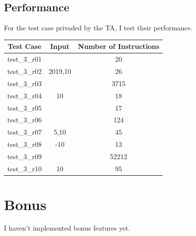 \documentclass{article}
\begin{document}
        \subsection{Performance}
            For the test case privaded by the TA, I test their performance.
            \begin{table}[!htbp]
                \centering
                \label{tab:Performance}
                \begin{tabular}{|c|c|c|}
                    \hline
                    Test Case & Input & Number of Instructions \\
                    \hline
                    test\_3\_r01 &              & 20    \\
                    \hline
                    test\_3\_r02 & 2019,10      & 26    \\
                    \hline
                    test\_3\_r03 &              & 3715  \\
                    \hline
                    test\_3\_r04 & 10           & 18    \\
                    \hline
                    test\_3\_r05 &              & 17    \\
                    \hline
                    test\_3\_r06 &              & 124   \\
                    \hline
                    test\_3\_r07 & 5,10         & 45    \\
                    \hline
                    test\_3\_r08 & -10          & 13    \\
                    \hline
                    test\_3\_r09 &              & 52212 \\
                    \hline
                    test\_3\_r10 & 10           & 95    \\
                    \hline
                \end{tabular}
            \end{table}
    \section{Bonus}
        I haven't implemented bonus features yet.
\end{document}
